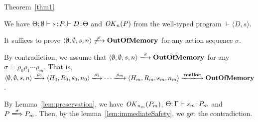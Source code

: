 \begin{pfof}{Theorem~\ref{thm1}}


We have \( \Theta;\emptyset \vdash s\!:\! P, \vdash D\!:\! \Theta\) and
\(\mathit{OK}_n(P)\) from the well-typed program \(\vdash \langle D,
s\rangle\).

It suffices to prove \( \langle \emptyset, \emptyset, s, n\rangle
\not\xlongrightarrow{\sigma} \OVERFLOW\) for any action sequence
\(\sigma\).

By contradiction, we assume that \( \langle \emptyset, \emptyset,
s, n\rangle \xlongrightarrow{\sigma} \OVERFLOW \) for any \(\sigma =
\rho_0\rho_1\cdots\rho_m\).  That is, \( \langle \emptyset, \emptyset, s, n\rangle
\xlongrightarrow{\rho_0} \langle H_0, R_0, s_0, n_0\rangle
\xlongrightarrow{\rho_1} \cdots \xlongrightarrow{\rho_m} \langle H_m,
R_m, s_m, n_m \rangle \xlongrightarrow{\Malloc} \OVERFLOW \).

By Lemma~\ref{lem:preservation}, we have \(\mathit{OK}_{n_m}(P_m)\),
\(\Theta;\Gamma\vdash s_m \!:\! P_m\) and \(P \xLongrightarrow{\sigma}
P_m\). Then, by the lemma~\ref{lem:immediateSafety}, we get the
contradiction.

\end{pfof}
